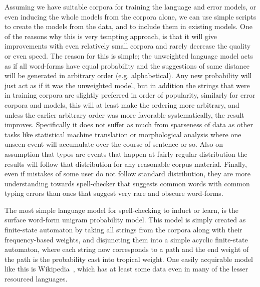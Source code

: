 \documentclass[a4paper,12pt]{article}
\begin{document}
Assuming we have suitable corpora for training the language and error models,
or even inducing the whole models from the corpora alone, we can use simple
scripts to create the models from the data, and to include them in existing
models. One of the reasons why this is very tempting approach, is that it will
give improvements with even relatively small corpora and rarely decrease the
quality or even speed. The reason for this is simple; the unweighted language
model acts as if all word-forms have equal probability and the suggestions of
same distance will be generated in arbitrary order (e.g. alphabetical). Any new
probability will just act as if it was the unweighted model, but in addition
the strings that were in training corpora are slightly preferred in order of
popularity, similarly for error corpora and models, this will at least make the
ordering more arbitrary, and unless the earlier arbitrary order was more
favorable systematically, the result improves. Specifically it does not suffer
as much from sparseness of data as other tasks like statistical machine
translation or morphological analysis where one unseen event will accumulate
over the course of sentence or so. Also on assumption that typos are events
that happen at fairly regular distribution the results will follow that
distribution for any reasonable corpus material. Finally, even if mistakes of
some user do not follow standard distribution, they are more understanding
towards spell-checker that suggests common words with common typing errors than
ones that suggest very rare and obscure word-forms.

The most simple language model for spell-checking to induct or learn, is
the surface word-form unigram probability model. This model is simply created
as finite-state automaton by taking all strings from the corpora along with
their frequency-based weights, and disjuncting them into a simple acyclic
finite-state automaton, where each string now corresponds to a path and the end
weight of the path is the probability cast into tropical weight. One easily
acquirable model like this is Wikipedia~\cite{pirinen/2010/lrec}, which has at
least some data even in many of the lesser resourced languages.
\end{document}
